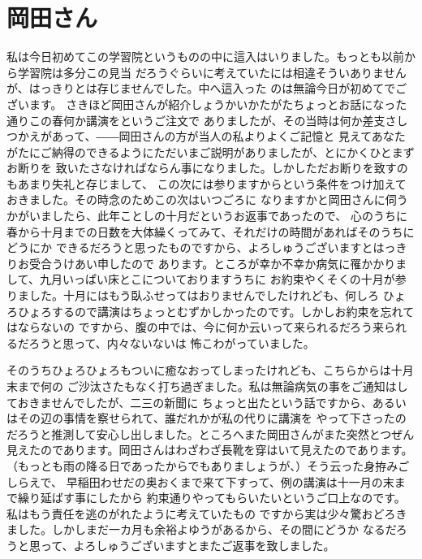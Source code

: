 \section{岡田さん}
  私は今日初めてこの学習院というものの中に這入はいりました。もっとも以前から学習院は多分この見当
  だろうぐらいに考えていたには相違そういありませんが、はっきりとは存じませんでした。中へ這入った
  のは無論今日が初めてでございます。
  さきほど岡田さんが紹介しょうかいかたがたちょっとお話になった通りこの春何か講演をというご注文で
  ありましたが、その当時は何か差支さしつかえがあって、――岡田さんの方が当人の私よりよくご記憶と
  見えてあなたがたにご納得のできるようにただいまご説明がありましたが、とにかくひとまずお断りを
  致いたさなければならん事になりました。しかしただお断りを致すのもあまり失礼と存じまして、
  この次には参りますからという条件をつけ加えておきました。その時念のためこの次はいつごろに
  なりますかと岡田さんに伺うかがいましたら、此年ことしの十月だというお返事であったので、
  心のうちに春から十月までの日数を大体繰くってみて、それだけの時間があればそのうちにどうにか
  できるだろうと思ったものですから、よろしゅうございますとはっきりお受合うけあい申したので
  あります。ところが幸か不幸か病気に罹かかりまして、九月いっぱい床とこについておりますうちに
  お約束やくそくの十月が参りました。十月にはもう臥ふせってはおりませんでしたけれども、何しろ
  ひょろひょろするので講演はちょっとむずかしかったのです。しかしお約束を忘れてはならないの
  ですから、腹の中では、今に何か云いって来られるだろう来られるだろうと思って、内々ないないは
  怖こわがっていました。

  そのうちひょろひょろもついに癒なおってしまったけれども、こちらからは十月末まで何の
  ご沙汰さたもなく打ち過ぎました。私は無論病気の事をご通知はしておきませんでしたが、二三の新聞に
  ちょっと出たという話ですから、あるいはその辺の事情を察せられて、誰だれかが私の代りに講演を
  やって下さったのだろうと推測して安心し出しました。ところへまた岡田さんがまた突然とつぜん
  見えたのであります。岡田さんはわざわざ長靴を穿はいて見えたのであります。
  （もっとも雨の降る日であったからでもありましょうが、）そう云った身拵みごしらえで、
  早稲田わせだの奥おくまで来て下すって、例の講演は十一月の末まで繰り延ばす事にしたから
  約束通りやってもらいたいというご口上なのです。私はもう責任を逃のがれたように考えていたもの
  ですから実は少々驚おどろきました。しかしまだ一カ月も余裕よゆうがあるから、その間にどうか
  なるだろうと思って、よろしゅうございますとまたご返事を致しました。
